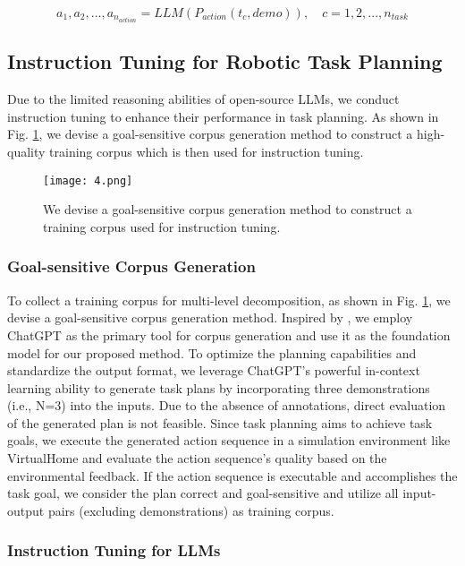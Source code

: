\begin{equation}
    a_1, a_2, ..., a_{n_{action}}=LLM(P_{action}(t_c, demo)), \quad c=1,2, ..., n_{task}
\end{equation}

\subsection{Instruction Tuning for Robotic Task Planning}

Due to the limited reasoning abilities of open-source LLMs, we conduct instruction tuning to enhance their performance in task planning. As shown in Fig. \ref{Figure 4}, we devise a goal-sensitive corpus generation method to construct a high-quality training corpus which is then used for instruction tuning.

\begin{figure}[h]
    \centering
    \texttt{[image: 4.png]}
    \caption{We devise a goal-sensitive corpus generation method to construct a training corpus used for instruction tuning.}
    \label{Figure 4}
\end{figure}

\subsubsection{Goal-sensitive Corpus Generation}

To collect a training corpus for multi-level decomposition, as shown in Fig. \ref{Figure 4}, we devise a goal-sensitive corpus generation method. Inspired by \cite{DBLP:journals/corr/abs-2305-06147,DBLP:journals/corr/abs-2303-15056}, we employ ChatGPT as the primary tool for corpus generation and use it as the foundation model for our proposed method. To optimize the planning capabilities and standardize the output format, we leverage ChatGPT's powerful in-context learning ability to generate task plans by incorporating three demonstrations (i.e., N=3) into the inputs. Due to the absence of annotations, direct evaluation of the generated plan is not feasible. Since task planning aims to achieve task goals, we execute the generated action sequence in a simulation environment like VirtualHome and evaluate the action sequence's quality based on the environmental feedback. If the action sequence is executable and accomplishes the task goal, we consider the plan correct and goal-sensitive and utilize all input-output pairs (excluding demonstrations) as training corpus.

\subsubsection{Instruction Tuning for LLMs}

